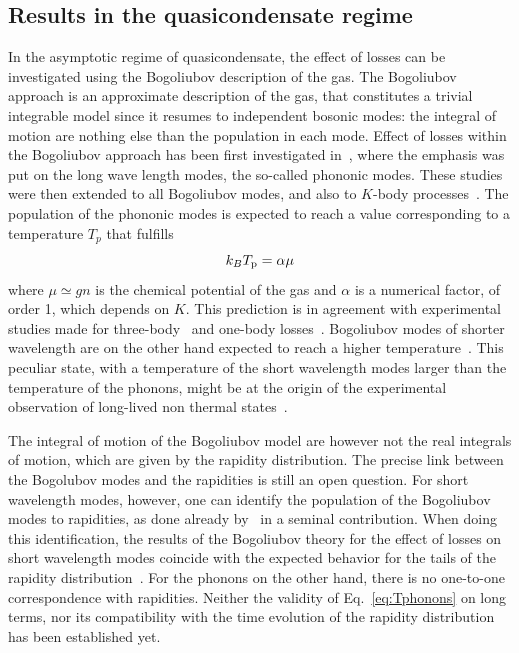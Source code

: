 \documentclass[onecolumn,amsfonts,showpacs,superscriptaddress]{revtex4-1}
\begin{document}
\subsection{Results in the quasicondensate regime}

In the asymptotic regime of quasicondensate, the 
effect of losses
can be investigated using the Bogoliubov description of the gas. 
The Bogoliubov approach is an approximate description of the gas, that constitutes a trivial integrable model since it resumes to independent bosonic modes: the integral of motion are nothing else than the population in each mode.
Effect of losses within the Bogoliubov approach has been 
first investigated in~\cite{rauer_cooling_2016,grisins_degenerate_2016}, where the emphasis was put on the 
long wave length modes, the so-called phononic modes.
These studies were then extended to all Bogoliubov modes, and also to $K$-body processes~\cite{johnson_long-lived_2017,bouchoule_cooling_2018}.
 The  population of the phononic modes is expected to reach a value corresponding to a temperature $T_p$ that fulfills
\begin{equation}
    k_B T_{\rm p} = \alpha \mu
    \label{eq:Tphonons}
\end{equation}
where $\mu\simeq gn $ is the chemical potential of the gas
and $\alpha$ is a numerical factor, of order 1, which depends on $K$. 
This prediction is in agreement with experimental studies made for three-body~\citep{schemmer_cooling_2018} and one-body losses~\citep{bouchoule_asymptotic_2020}. 
Bogoliubov modes of shorter wavelength are on the other hand expected to reach a higher temperature~\citep{grisins_degenerate_2016,johnson_long-lived_2017}. This peculiar state, with a temperature of the short wavelength modes larger than the temperature of the phonons, might be at the origin of the experimental observation of long-lived non thermal states~\citep{johnson_long-lived_2017}. 

The integral of motion of the Bogoliubov model are however not the real integrals of motion, which are given by the rapidity distribution. The precise link between the Bogolubov modes and the rapidities is still an open question. For short wavelength modes, however, one can 
identify the population of the Bogoliubov modes to rapidities, as done already by~\cite{lieb_exact_1963} in a seminal contribution. When doing this identification, the results of the Bogoliubov theory for the effect of losses on short wavelength modes coincide with the expected behavior for the tails of the 
rapidity distribution~\citep{bouchoule_breakdown_2020}.
For the phonons on the other hand, there is no one-to-one correspondence with rapidities. Neither the validity of Eq.~\eqref{eq:Tphonons} on long terms, nor 
its compatibility with the time evolution of the rapidity distribution has been established yet. 
 
\end{document}
